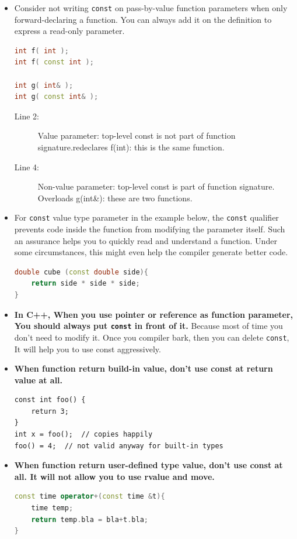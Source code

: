 \documentclass[a4paper,11pt,twoside]{book}
\begin{document}
\begin{itemize}
	\item  Consider not writing \texttt{const} on pass-by-value function parameters when only forward-declaring a function. You can always add it on the definition to express a read-only parameter.
\begin{lstlisting}[frame=single, language=c++]
int f( int );
int f( const int );    

int g( int& );
int g( const int& );   
\end{lstlisting}
\begin{description}
	\item[Line 2:] Value parameter: top-level const is not part of function signature.redeclares f(int): this is the same function.
	
	\item[Line 4:] Non-value parameter: top-level const is part of function signature. Overloads g(int\&): these are two functions.
\end{description}
	
	\item For \texttt{const} value type parameter in the example below, the \texttt{const} qualifier prevents code inside the function from modifying the parameter itself. Such an assurance helps you to quickly read and understand a function. Under some circumstances, this might even help the compiler generate better code. 
\begin{lstlisting}[frame=single, language=c++]
double cube (const double side){
	return side * side * side;
}
\end{lstlisting}
	
	\item \textbf{In C++, When you use pointer or reference as function parameter, You should always put \texttt{const} in front of it.} Because most of time you don't need to modify it.  Once you compiler bark, then you can delete \texttt{const}, It will help you to use const aggressively.
	
	\item \textbf{When function return build-in value, don't use const at return value at all. }
\begin{lstlisting}[numbers=none]
const int foo() {
	return 3;
}
int x = foo();  // copies happily
foo() = 4;  // not valid anyway for built-in types
\end{lstlisting}
	
\item \textbf{When function return user-defined type value, don't use const at all. It will not allow you to use rvalue and move. }
\begin{lstlisting}[frame=single, language=c++]
const time operator+(const time &t){
	time temp;
	return temp.bla = bla+t.bla;
}
	

\end{lstlisting}
\end{itemize}
\end{document}
